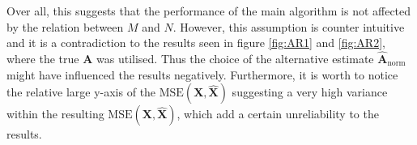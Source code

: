 Over all, this suggests that the performance of the main algorithm is not affected by the relation between $M$ and $N$.
However, this assumption is counter intuitive and it is a contradiction to the results seen in figure \ref{fig:AR1} and \ref{fig:AR2}, where the true $\mathbf{A}$ was utilised. 
Thus the choice of the alternative estimate $\hat{\mathbf{A}}_{\text{norm}}$ might have influenced the results negatively. 
Furthermore, it is worth to notice the relative large y-axis of the $\text{MSE}(\mathbf{X}, \hat{\mathbf{X}})$ suggesting a very high variance within the resulting $\text{MSE}(\mathbf{X}, \hat{\mathbf{X}})$, which add a certain unreliability to the results.    